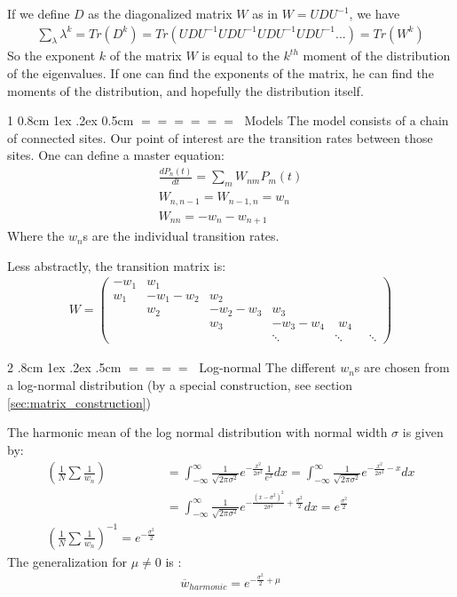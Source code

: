 \documentclass[onecolumn,fleqn,notitlepage,secnumarabic]{revtex4}
\makeatletter
\def\section{%
  \@startsection
    {section}%
    {1}%
    {\z@}%
    {0.8cm \@plus1ex \@minus .2ex}%
    {0.5cm}%
    {\Large\bf $=\!=\!=\!=\!=\!=\;$}%
}%
\def\subsection{%
  \@startsection
    {subsection}%
    {2}%
    {\z@}%
    {.8cm \@plus1ex \@minus .2ex}%
    {.5cm}%
    {\normalfont\small\bfseries$=\!=\!=\!=\;$}%
}%
\makeatother
\begin{document}
If we define $D$ as the diagonalized matrix $W$ as in $W=UDU^{-1}$, we have
\begin{align}\label{eq:eig_moments}
\sum_\lambda \lambda^k = Tr (D^k) = Tr(UDU^{-1}UDU^{-1}UDU^{-1}UDU^{-1}...) = Tr (W^k)
\end{align}
So the exponent $k$ of the matrix $W$ is equal to the $k^{th}$ moment of the distribution of the eigenvalues. If one can find the exponents of the matrix, he can find the moments of the distribution, and hopefully the distribution itself. 

\section{Models}\label{sec:our_model}
The model consists of a chain of connected sites. Our point of interest are the transition rates between those sites. One can define a master equation:
\begin{align}
\frac{dP_n(t)}{dt} = \sum_m W_{nm}P_m(t) \\
W_{n,n-1} = W_{n-1,n} = w_n \\
W_{nn} = -w_n - w_{n+1}
\end{align}
Where the $w_n$s are the individual transition rates.

Less abstractly, the transition matrix is:
\begin{align}
W = 
\begin{pmatrix}
-w_1  & w_1 \\
w_1  & -w_1-w_2 &  w_2 \\
 & w_2 & -w_2-w_3 &  w_3 \\
& & w_3 & -w_3-w_4 & \; w_4 \\
& & & \ddots &\ddots&\;\;\ddots
\end{pmatrix}
\end{align}
\subsection{Log-normal}
The different $w_n$s are chosen from a log-normal distribution (by a special construction, see section \ref{sec:matrix_construction})

The harmonic mean of the log normal distribution with normal width $\sigma$ is given by:
\begin{align}
\left(\frac{1}{N}\sum\frac{1}{w_n}\right)&= \int_{-\infty}^\infty \frac{1}{\sqrt{2\pi\sigma^2}}e^{-\frac{x^2}{2\sigma^2}} \frac{1}{e^x} dx  = \int_{-\infty}^\infty \frac{1}{\sqrt{2\pi\sigma^2}}e^{-\frac{x^2}{2\sigma^2}-x} dx \\
&= \int_{-\infty}^\infty \frac{1}{\sqrt{2\pi\sigma^2}}e^{-\frac{\left(x-\sigma^2\right)^2}{2\sigma^2}+\frac{\sigma^2}{2}} dx = e^{\frac{\sigma^2}{2}}\\
\left(\frac{1}{N}\sum\frac{1}{w_n}\right)^{-1} = e^{-\frac{\sigma^2}{2}}
\end{align}
The generalization for $\mu\neq 0$ is :
\begin{align}
\overline{w}_{harmonic} = e^{-\frac{\sigma^2}{2}+\mu}
\end{align}
\end{document}
